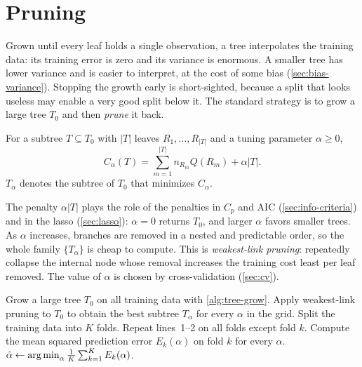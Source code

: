 \section{Pruning}\label{sec:tree-pruning}

Grown until every leaf holds a single observation, a tree interpolates the training data: its training error is zero and its variance is enormous. A smaller tree has lower variance and is easier to interpret, at the cost of some bias (\cref{sec:bias-variance}). Stopping the growth early is short-sighted, because a split that looks useless may enable a very good split below it. The standard strategy is to grow a large tree $T_0$ and then \emph{prune} it back.

\begin{definition}\label{def:cost-complexity}
For a subtree $T\subseteq T_0$ with $|T|$ leaves $R_1,\dots,R_{|T|}$ and a tuning parameter $\alpha\ge0$,
\[
C_\alpha(T)=\sum_{m=1}^{|T|}n_{R_m}Q(R_m)+\alpha|T|.
\]
$T_\alpha$ denotes the subtree of $T_0$ that minimizes $C_\alpha$.
\end{definition}

The penalty $\alpha|T|$ plays the role of the penalties in $C_p$ and AIC (\cref{sec:info-criteria}) and in the lasso (\cref{sec:lasso}): $\alpha=0$ returns $T_0$, and larger $\alpha$ favors smaller trees. As $\alpha$ increases, branches are removed in a nested and predictable order, so the whole family $\{T_\alpha\}$ is cheap to compute. This is \emph{weakest-link pruning}: repeatedly collapse the internal node whose removal increases the training cost least per leaf removed. The value of $\alpha$ is chosen by cross-validation (\cref{sec:cv}).

\begin{algorithm}[H]
\caption{Building a Regression Tree with Cost Complexity Pruning}\label{alg:tree-prune}
\begin{algorithmic}[1]
\State Grow a large tree $T_0$ on all training data with \cref{alg:tree-grow}.
\State Apply weakest-link pruning to $T_0$ to obtain the best subtree $T_\alpha$ for every $\alpha$ in the grid.
\State Split the training data into $K$ folds.
  \State Repeat lines~1--2 on all folds except fold $k$.
  \State Compute the mean squared prediction error $E_k(\alpha)$ on fold $k$ for every $\alpha$.
\EndFor
\State $\hat\alpha\gets\operatorname*{arg\,min}_\alpha\frac1K\sum_{k=1}^KE_k(\alpha)$.
\end{algorithmic}
\end{algorithm}


